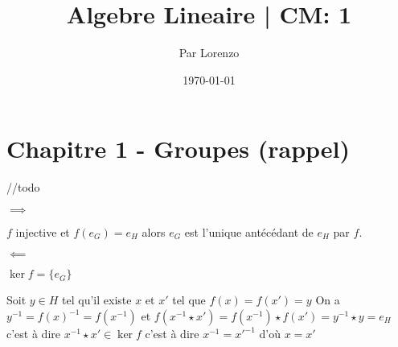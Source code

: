 \documentclass[a4paper, 12pt]{article}
\title{Algebre Lineaire | CM: 1}
\author{Par Lorenzo}
\date{\today}
\begin{document}
\maketitle

\section{Chapitre 1 - Groupes (rappel)}

//todo

\begin{demonstration}

$\implies$

$f$ injective et $f(e_G) = e_H$ alors $e_G$ est l'unique antécédant de $e_H$ par $f$.

\quad

$\impliedby$

$\ker f = \{e_G\}$

Soit $y \in H$ tel qu'il existe $x$ et $x'$ tel que $f(x) = f(x') = y$
On a $y^{-1} = f(x)^{-1} = f(x^{-1})$
et
$f(x^{-1} \star x') = f(x^{-1}) \star f(x') = y^{-1} \star y = e_H$
c'est à dire $x^{-1} \star x' \in \ker f$
c'est à dire $x^{-1} = x'^{-1}$ d'où $x = x'$

\end{demonstration}
\end{document}
